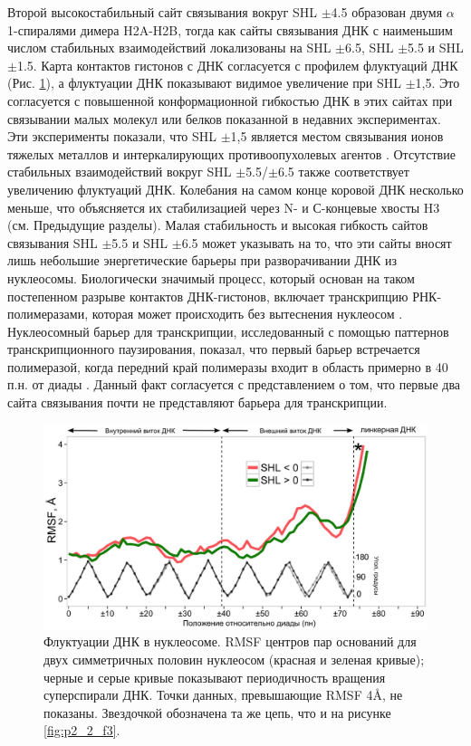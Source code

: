     Второй высокостабильный сайт связывания вокруг SHL $\pm$4.5 образован двумя $\alpha$1-спиралями димера H2A-H2B, тогда как сайты связывания ДНК с наименьшим числом стабильных взаимодействий локализованы на SHL $\pm$6.5, SHL $\pm$5.5 и SHL $\pm$1.5. Карта контактов гистонов с ДНК согласуется с профилем флуктуаций ДНК (Рис. \ref{fig:p2_2_f9}), а флуктуации ДНК показывают видимое увеличение при SHL $\pm$1,5. Это согласуется с повышенной конформационной гибкостью ДНК в этих сайтах при связывании малых молекул или белков показанной в недавних экспериментах. Эти эксперименты показали, что SHL $\pm$1,5 является местом связывания ионов тяжелых металлов и интеркалирующих противоопухолевых агентов \cite{tan_nucleosome_2011}. Отсутствие стабильных взаимодействий вокруг SHL $\pm$5.5/$\pm$6.5 также соответствует увеличению флуктуаций ДНК. Колебания на самом конце коровой ДНК несколько меньше, что объясняется их стабилизацией через N- и С-концевые хвосты H3 (см. Предыдущие разделы). Малая стабильность и высокая гибкость сайтов связывания SHL $\pm$5.5 и SHL $\pm$6.5 может указывать на то, что эти сайты вносят лишь небольшие энергетические барьеры при разворачивании ДНК из нуклеосомы. Биологически значимый процесс, который основан на таком постепенном разрыве контактов ДНК-гистонов, включает транскрипцию РНК-полимеразами, которая может происходить без вытеснения нуклеосом \cite{studitsky_mechanism_1997}. Нуклеосомный барьер для транскрипции, исследованный с помощью паттернов транскрипционного паузирования, показал, что первый барьер встречается полимеразой, когда передний край полимеразы входит в область примерно в 40 п.н. от диады \cite{jin_synergistic_2010}. Данный факт согласуется с представлением о том, что первые два сайта связывания почти не представляют барьера для транскрипции.


\begin{figure} [H]
    \centering
    \includegraphics[width=\textwidth]{images/p2/jmb/part2_2_f9.pdf}
    \caption[Флуктуации ДНК в нуклеосоме]{Флуктуации ДНК в нуклеосоме. RMSF центров пар оснований для двух симметричных половин нуклеосом (красная и зеленая кривые); черные и серые кривые показывают периодичность вращения суперспирали ДНК. Точки данных, превышающие RMSF 4\AA, не показаны. Звездочкой обозначена та же цепь, что и на рисунке \ref{fig:p2_2_f3}.}
    \label{fig:p2_2_f9}
\end{figure}

